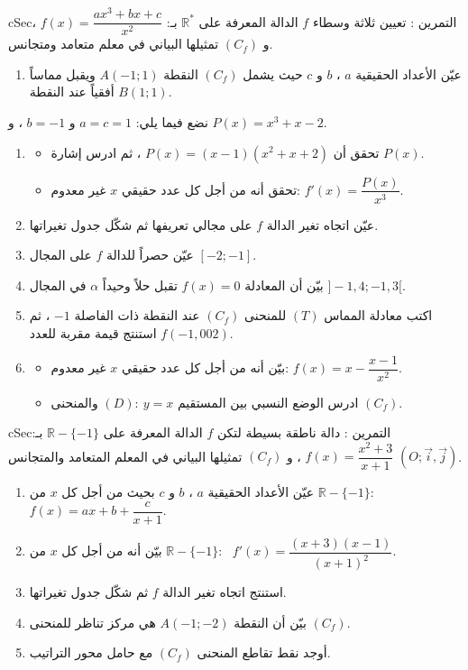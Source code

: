 \documentclass[12pt,a4paper]{article}
\newenvironment{BOX}[2]{\begin{otherlanguage}{english}\begin{arbox}{#1}{#2}}{\end{arbox}\end{otherlanguage}}
\newcounter{exo}
\newenvironment{tamrin}[1]{\stepcounter{exo}\begin{BOX}{cSec}{التمرين \theexo: #1}}{\end{BOX}}
\newcommand{\R}{\mathbb{R}}
\newenvironment{sq}{\begin{itemize}[leftmargin=2.4em,itemsep=3pt]}{\end{itemize}}
\newcommand{\qa}{\item[(أ)]}\newcommand{\qb}{\item[(ب)]}\newcommand{\qc}{\item[(جـ)]}\newcommand{\qd}{\item[(د)]}\newcommand{\qe}{\item[(هـ)]}
\begin{document}
\begin{tamrin}{تعيين ثلاثة وسطاء}
$f$ الدالة المعرفة على $\R^*$ بـ: $f(x)=\dfrac{ax^3+bx+c}{x^2}$ ، و $(C_f)$ تمثيلها البياني في معلم متعامد ومتجانس.
\begin{enumerate}
\item عيّن الأعداد الحقيقية $a$ ، $b$ و $c$ حيث يشمل $(C_f)$ النقطة $A(-1;1)$ ويقبل مماساً أفقياً عند النقطة $B(1;1)$.
\end{enumerate}
نضع فيما يلي: $a=c=1$ و $b=-1$ ، و $P(x)=x^3+x-2$.
\begin{enumerate}[resume]
\item
\begin{sq}
\qa تحقق أن $P(x)=(x-1)(x^2+x+2)$ ، ثم ادرس إشارة $P(x)$.
\qb تحقق أنه من أجل كل عدد حقيقي $x$ غير معدوم: $f'(x)=\dfrac{P(x)}{x^3}$.
\end{sq}
\item عيّن اتجاه تغير الدالة $f$ على مجالي تعريفها ثم شكّل جدول تغيراتها.
\item عيّن حصراً للدالة $f$ على المجال $[-2;-1]$.
\item بيّن أن المعادلة $f(x)=0$ تقبل حلاً وحيداً $\alpha$ في المجال $]-1{,}4;-1{,}3[$.
\item اكتب معادلة المماس $(T)$ للمنحنى $(C_f)$ عند النقطة ذات الفاصلة $-1$ ، ثم استنتج قيمة مقربة للعدد $f(-1{,}002)$.
\item
\begin{sq}
\qa بيّن أنه من أجل كل عدد حقيقي $x$ غير معدوم: $f(x)=x-\dfrac{x-1}{x^2}$.
\qb ادرس الوضع النسبي بين المستقيم $(D):\ y=x$ والمنحنى $(C_f)$.
\end{sq}
\end{enumerate}
\end{tamrin}

\begin{tamrin}{دالة ناطقة بسيطة}
لتكن $f$ الدالة المعرفة على $\R-\{-1\}$ بـ: $f(x)=\dfrac{x^2+3}{x+1}$ ، و $(C_f)$ تمثيلها البياني في المعلم المتعامد والمتجانس $(O;\vec i,\vec j)$.
\begin{enumerate}
\item عيّن الأعداد الحقيقية $a$ ، $b$ و $c$ بحيث من أجل كل $x$ من $\R-\{-1\}$: $f(x)=ax+b+\dfrac{c}{x+1}$.
\item بيّن أنه من أجل كل $x$ من $\R-\{-1\}$: \ $f'(x)=\dfrac{(x+3)(x-1)}{(x+1)^2}$.
\item استنتج اتجاه تغير الدالة $f$ ثم شكّل جدول تغيراتها.
\item بيّن أن النقطة $A(-1;-2)$ هي مركز تناظر للمنحنى $(C_f)$.
\item أوجد نقط تقاطع المنحنى $(C_f)$ مع حامل محور التراتيب.
\end{enumerate}
\end{tamrin}
\end{document}
